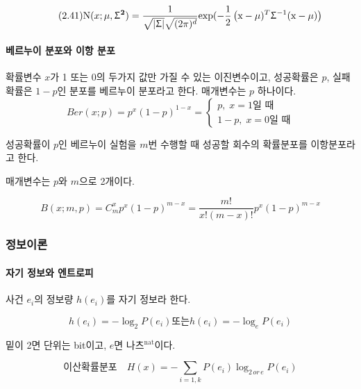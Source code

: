 \documentclass [12pt] {oblivoir}
\let\oldsubsubsection=\subsubsection
\renewcommand{\subsubsection}
{
  \filbreak
  \oldsubsubsection
}
\begin{document}
\begin{equation} \tag{2.41}
  \text{N}(x; \mu, \mathbf{\Upsigma^{2}}) = \frac{1}{\sqrt{|\mathbf{\Upsigma}|}\sqrt{(2\pi)^{d}}}\text{exp}(-\frac{1}{2}\left(\mathbf{\text{x}} - \mathbf{\mu})^{T}\mathbf{\Upsigma}^{-1}(\mathbf{\text{x} - \mu})\right)
\end{equation}

\paragraph*{베르누이 분포와 이항 분포}\mbox{}

확률변수 $x$가 1 또는 0의 두가지 값만 가질 수 있는 이진변수이고, 성공확률은 $p$, 실패확률은 $1-p$인 분포를 베르누이 분포라고 한다. 매개변수는 $p$ 하나이다.
\begin{equation} \tag{2.42}
  Ber(x; p) = p^{x}(1 - p)^{1 - x} =
  \begin{cases}
    p,\;x = 1 \text{일 때} \\
    1 - p,\;x = 0 \text{일 때}
  \end{cases}
\end{equation}

성공확률이 $p$인 베르누이 실험을 $m$번 수행할 때 성공할 회수의 확률분포를 이항분포라고 한다.

매개변수는 $p$와 $m$으로 2개이다.

\begin{equation} \tag{2.43}
  B(x; m, p) = C_{m}^{x}p^{x}(1 - p)^{m - x} = \frac{m!}{x!(m - x)!}p^{x}(1 - p)^{m - x}
\end{equation}

\subsubsection{정보이론}

\paragraph*{자기 정보와 엔트로피}\mbox{}

사건 $e_{i}$의 정보량 $h(e_{i})$를 자기 정보라 한다.

\begin{equation} \tag{2.44}
  h(e_{i}) = -\log_{2}P(e_{i}) \text{또는} h(e_{i}) = -\log_{e}P(e_{i})
\end{equation}

밑이 2면 단위는 bit이고, $e$면 나츠$^{\text{nat}}$이다.

\begin{equation} \tag{2.45}
  \text{이산확률분포} \quad H(x) = -\sum_{i=1, k}P(e_{i})\log_{2\,or\,e}P(e_{i})
\end{equation}
\end{document}
